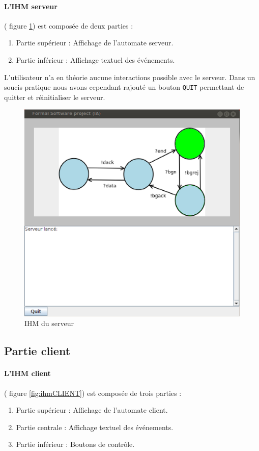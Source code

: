 \paragraph{L'IHM serveur} (\cf{} figure \ref{fig:ihmIA}) est composée de deux parties : 
\begin{enumerate}
\item 
Partie supérieur : Affichage de l'automate serveur.
\item
Partie inférieur : Affichage textuel des événements.
\end{enumerate}
L'utilisateur n'a en théorie aucune interactions possible avec le serveur. Dans un soucis pratique nous avons cependant rajouté un bouton \texttt{QUIT} permettant de quitter et réinitialiser le serveur.
 \begin{figure}[htb]
   \centering
   \includegraphics[scale=.5]{img/ihmIA.eps}
   \caption{IHM du serveur}
   \label{fig:ihmIA}
 \end{figure}


\clearpage
\subsection{Partie client}
\paragraph{L'IHM client}(\cf{} figure \ref{fig:ihmCLIENT}) est composée de trois parties : 
\begin{enumerate}
\item 
Partie supérieur : Affichage de l'automate client.
\item
Partie centrale : Affichage textuel des événements.
\item 
Partie inférieur : Boutons de contrôle.
\end{enumerate}

